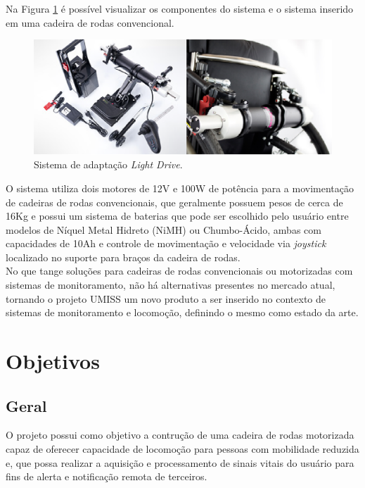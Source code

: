 Na Figura \ref{ldrive} é possível visualizar os componentes do sistema e
o sistema inserido em uma cadeira de rodas convencional.

\begin{figure}[h]
    \centering
    \label{ldrive}
    \includegraphics[keepaspectratio=true,scale=0.7]{figuras/ldrive.eps}
    \caption{Sistema de adaptação \textit{Light Drive}.}
\end{figure}

O sistema utiliza dois motores de 12V e 100W de potência para a movimentação 
de cadeiras de rodas convencionais, que geralmente possuem pesos de cerca de 16Kg 
e possui um sistema de baterias que pode ser escolhido pelo usuário entre modelos 
de Níquel Metal Hidreto  (NiMH) ou Chumbo-Ácido, ambas com capacidades de 10Ah 
e controle de movimentação e velocidade via \textit{joystick} localizado no 
suporte para braços da cadeira de rodas.\\

No que tange soluções para cadeiras de rodas convencionais ou motorizadas
com sistemas de monitoramento, não há alternativas presentes no mercado
atual, tornando o projeto UMISS um novo produto a ser inserido no contexto
de sistemas de monitoramento e locomoção, definindo o mesmo como estado da arte.

\section{Objetivos}

\subsection{Geral}
O projeto possui como objetivo a contrução de uma cadeira de rodas motorizada capaz de
oferecer capacidade de locomoção para pessoas com mobilidade reduzida
e, que possa realizar
a aquisição e processamento de sinais vitais do usuário para fins de alerta e notificação
remota de terceiros.


